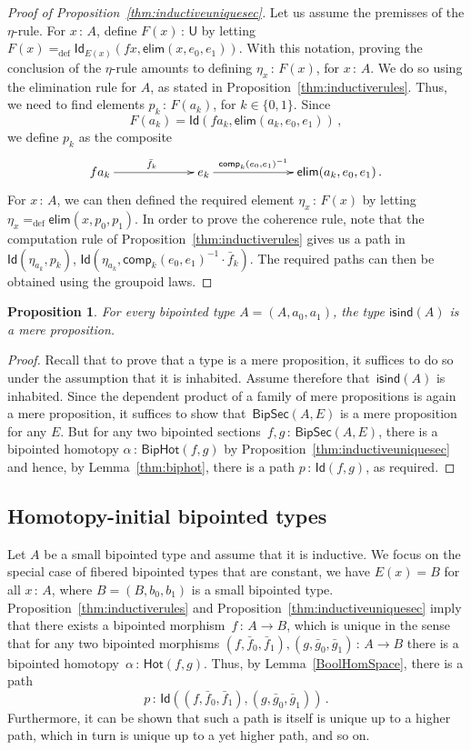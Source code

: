 \documentclass[10pt,a4paper,oneside,reqno]{amsart}
\numberwithin{equation}{section}
\theoremstyle{mythm}
\newtheorem{proposition}[theorem]{Proposition}
\theoremstyle{mydef}
\theoremstyle{myrmk}
\newcommand{\ie}{\text{i.e.\ }}
\newcommand{\defeq}{=_{\mathrm{def}}}
\newcommand{\co}{\,{:}\,}
\newcommand{\ct}{\cdot}
\newcommand{\isbipind}{\mathsf{isind}}
\newcommand{\Hot}{\mathsf{Hot}}
\newcommand{\Id}{\mathsf{Id}}
\newcommand{\U}{\mathsf{U}}
\newcommand{\BipHot}{\mathsf{BipHot}}
\newcommand{\BipSec}{\mathsf{BipSec}}
\newcommand{\elim}{\mathsf{elim}}
\newcommand{\comp}{\mathsf{comp}}
\begin{document}
\begin{proof}[Proof of Proposition~\ref{thm:inductiveuniquesec}] Let us assume the premisses of the $\eta$-rule. For $x \co A$, define $F(x) \co \U$  by letting $F(x) \defeq 
\Id_{E(x)}(fx, \elim(x, e_0, e_1))$. 
With this notation, proving the conclusion of the $\eta$-rule amounts to defining
$\eta_x \co F(x)$, for $x \co A$. We do so using the elimination rule for $A$, as stated in Proposition~\ref{thm:inductiverules}.
Thus, we need to find elements $p_k \co F(a_k)$, for $k \in \{0, 1\}$. Since
\[
F(a_k) = \Id(fa_k, \elim(a_k, e_0, e_1)) \, ,
\]
we define $p_k$ as the composite
\[
\xymatrix@C=2.2cm{
 fa_k \ar[r]^{\bar{f}_k} &
 e_k \ar[r]^-{ \comp_k(e_0, e_1)^{-1}}& 
  \elim(a_k, e_0, e_1)  \, .}
\]
For $x \co A$, we can then defined the required element $\eta_x \co F(x)$ by letting $\eta_x \defeq \elim(x, p_0, p_1)$.
In order to prove the coherence rule, note that the computation rule of Proposition~\ref{thm:inductiverules} gives us a path in $\Id(\eta_{a_k},  p_k)$, \ie  $\Id( \eta_{a_k},  \comp_k(e_0, e_1)^{-1} \ct \bar{f}_k ) $. 
The required paths can then be obtained using the groupoid laws.
 \end{proof} 

\begin{proposition} \label{thm:isbipindisprop} For every bipointed type $A = (A, a_0, a_1)$, the type $\isbipind(A)$ is a mere proposition.
\end{proposition}

\begin{proof} Recall that to prove that a type  is a mere proposition, it suffices to do so under the assumption that it is inhabited. Assume therefore that~$\isbipind(A)$ is inhabited. Since the dependent product of a family of mere propositions is again a mere proposition, it suffices to show that~$\BipSec(A,E)$ is a mere proposition for any $E$. But for any two bipointed sections~$f, g \co \BipSec(A,E)$,  there is a 
bipointed homotopy $\alpha \co \BipHot(f,g)$ by Proposition~\ref{thm:inductiveuniquesec} and hence, by 
Lemma~\ref{thm:biphot}, there is a path $p \co \Id(f,g)$, as required. 
\end{proof} 


\subsection*{Homotopy-initial bipointed types} 
 Let $A$ be a small bipointed type and assume that it is inductive. 
 We focus on the special case of fibered bipointed types that 
are constant, \ie we have $E(x) = B$ for all $x \co A$, where $B = (B, b_0, b_1)$  is
a small bipointed type. 
 Proposition~\ref{thm:inductiverules} and Proposition~\ref{thm:inductiveuniquesec}
imply that there exists a bipointed morphism~$f \co A \to B$, which is unique in the sense that  for any two bipointed morphisms $(f, \bar{f}_0, \bar{f}_1), (g, \bar{g}_0, \bar{g}_1) \co A \to B$  there is a bipointed 
homotopy~$\alpha \co \Hot(f, g)$. Thus, by Lemma~\ref{BoolHomSpace}, there is a path 
\[
p \co \Id((f, \bar{f}_0, \bar{f}_1), (g, \bar{g}_0, \bar{g}_1)) \, .
\] 
Furthermore, it can be shown that such a path is itself is unique up to a higher path, which in turn is unique up to a yet higher path, and so on. 
\end{document}
